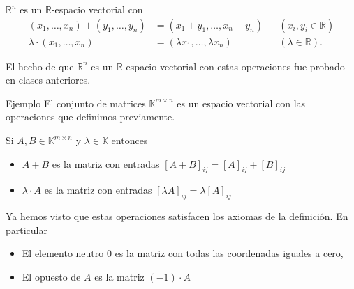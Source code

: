 \documentclass[handout]{beamer} %
\newcommand{\R}{\mathbb R}
\newcommand{\K}{\mathbb K}
\begin{document}
    
\begin{frame}
    \begin{ejemplo}
        $\R^n$  es un $\R$-espacio vectorial con 
        \begin{align*}
            (x_1,\ldots,x_n) + (y_1,\ldots,y_n) &= (x_1+y_1,\ldots,x_n+y_n)&&(x_i,y_i \in \R) \\
            \lambda \cdot (x_1,\ldots,x_n) &= (\lambda x_1,\ldots,\lambda x_n)&&(\lambda \in \R).
        \end{align*}

        El  hecho  de que $\R^n$  es un $\R$-espacio vectorial con estas operaciones  fue probado en clases anteriores. 
        
        \vskip 3cm
    \end{ejemplo}
\end{frame}   
\begin{frame}

\begin{block}{Ejemplo}\pause
El conjunto de matrices $\K^{m\times n}$ es un espacio vectorial con las operaciones que definimos previamente.
\end{block}
\pause
\begin{block}{}
Si $A,B\in\K^{m\times n}$ y $\lambda\in\K$ entonces
\begin{itemize}
    \item $A+B$ es la matriz con entradas $[A+B]_{ij}=[A]_{ij}+[B]_{ij}$
    \item $\lambda\cdot A$ es la matriz con entradas $[\lambda A]_{ij}=\lambda[A]_{ij}$
\end{itemize} 
\end{block}
\pause
Ya hemos visto que estas operaciones satisfacen los axiomas de la definición. En particular
\pause
\begin{block}{}
\begin{itemize}
    \item El elemento neutro $0$ es la matriz con todas las coordenadas iguales a cero,\pause
    \item El opuesto de $A$ es la matriz $(-1)\cdot A$
\end{itemize} 
\end{block}
\end{frame}
\end{document}
